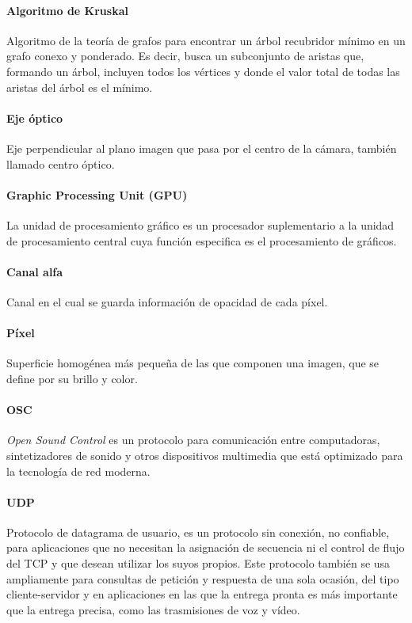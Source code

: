 \paragraph{Algoritmo de Kruskal}
Algoritmo de la teoría de grafos para encontrar un árbol recubridor mínimo en un grafo conexo y ponderado. Es decir, busca un subconjunto de aristas que, formando un árbol, incluyen todos los vértices y donde el valor total de todas las aristas del árbol es el mínimo.

\paragraph{Eje óptico} 
Eje perpendicular al plano imagen que pasa por el centro de la cámara, también llamado centro óptico\cite{OpticalDesign}.

\paragraph{Graphic Processing Unit (GPU)}
La unidad de procesamiento gráfico es un procesador suplementario a la unidad de procesamiento central cuya función especifica es el procesamiento de gráficos\cite{GPUWork}.

\paragraph{Canal alfa}
Canal en el cual se guarda información de opacidad de cada píxel\cite{3DGraphics}.

\paragraph{Píxel}
Superficie homogénea más pequeña de las que componen una imagen, que se define por su brillo y color\cite{RAE}.

\paragraph{OSC}
\emph{Open Sound Control} es un protocolo para comunicación entre computadoras, sintetizadores de sonido y otros dispositivos multimedia que está optimizado para la tecnología de red moderna\cite{OSCProtocol}.

\paragraph{UDP}
Protocolo de datagrama de usuario, es un protocolo sin conexión, no confiable, para aplicaciones que no necesitan la asignación de secuencia ni el control de flujo del TCP y que desean utilizar los suyos propios. Este protocolo también se usa ampliamente para consultas de petición y respuesta de una sola ocasión, del tipo cliente-servidor y en aplicaciones en las que la entrega pronta es más importante que la entrega precisa, como las trasmisiones de voz y vídeo\cite{Tanenbaum}.